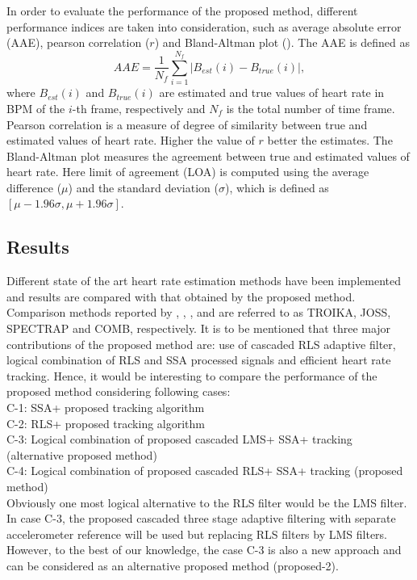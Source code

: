 \documentclass[final,3p,times,authoryear]{elsarticle}
\begin{document}
In order to evaluate the performance of the proposed method, different performance indices are taken into consideration, such as average absolute error (AAE), pearson correlation ($r$) and Bland-Altman plot (\cite{bib:Bland}). The AAE is defined as 
\begin{equation}
AAE = \frac{1}{N_f} \displaystyle\sum\limits_{i=1}^{N_f} | B_{est}(i)-B_{true}(i) |,
\end{equation}
where $B_{est}(i)$ and $B_{true}(i)$ are estimated and true values of heart rate in BPM of the $i$-th frame, respectively  and $N_f$ is the total number of time frame. Pearson correlation is a measure of degree of similarity between true and estimated values of heart rate. Higher the value of $r$ better the estimates. The Bland-Altman plot measures the agreement between true and estimated values of heart rate. Here limit of agreement (LOA) is computed using the average difference ($\mu$) and the standard deviation ($\sigma$), which is defined as $[\mu - 1.96\sigma, \mu + 1.96\sigma]$. 




\subsection{Results}

Different state of the art heart rate estimation methods have been implemented and results are compared with that obtained by the proposed method. Comparison methods reported by \cite{bib:TROIKA}, \cite{bib:JOSS}, \cite{bib:SPECTRAP}, and \cite{bib:zhangcomb} are referred to as TROIKA, JOSS, SPECTRAP and COMB, respectively. It is to be mentioned that three major contributions of the proposed method are: use of cascaded RLS adaptive filter, logical combination of RLS and SSA processed signals and efficient heart rate tracking. Hence, it would be interesting to compare the performance of the proposed method considering following cases:\\
C-1: SSA+ proposed tracking algorithm\\
C-2: RLS+ proposed tracking algorithm\\
C-3: Logical combination of proposed cascaded LMS+ SSA+ tracking (alternative proposed method)\\
C-4: Logical combination of proposed cascaded RLS+ SSA+ tracking (proposed method)\\
Obviously one most logical alternative to the RLS filter would be the LMS filter. In case C-3, the proposed cascaded three stage adaptive filtering with separate accelerometer reference will be used but replacing RLS filters by LMS filters. However, to the best of our knowledge, the case C-3 is also a new approach and can be considered as an alternative proposed method (proposed-2).
\end{document}
